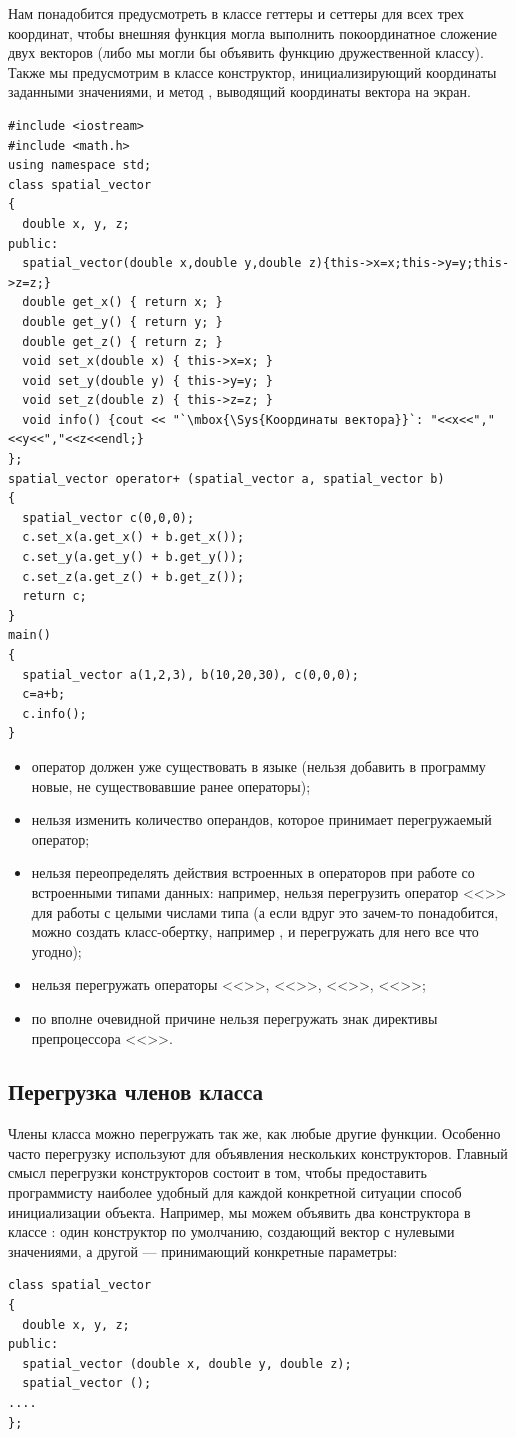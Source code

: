 Нам понадобится предусмотреть в классе 
геттеры и сеттеры для всех трех координат,  чтобы внешняя функция могла выполнить покоординатное сложение двух векторов
(либо мы могли бы объявить функцию дружественной классу). Также мы предусмотрим в классе конструктор, инициализирующий
координаты заданными значениями, и метод , выводящий координаты вектора
на экран. 
\begin{lstlisting}
#include <iostream>
#include <math.h>
using namespace std;
class spatial_vector 
{
  double x, y, z;
public:
  spatial_vector(double x,double y,double z){this->x=x;this->y=y;this->z=z;}
  double get_x() { return x; }
  double get_y() { return y; }
  double get_z() { return z; }
  void set_x(double x) { this->x=x; }
  void set_y(double y) { this->y=y; }
  void set_z(double z) { this->z=z; }
  void info() {cout << "`\mbox{\Sys{Координаты вектора}}`: "<<x<<","<<y<<","<<z<<endl;}
};
spatial_vector operator+ (spatial_vector a, spatial_vector b) 
{
  spatial_vector c(0,0,0);
  c.set_x(a.get_x() + b.get_x());
  c.set_y(a.get_y() + b.get_y());
  c.set_z(a.get_z() + b.get_z());
  return c;
}
main() 
{
  spatial_vector a(1,2,3), b(10,20,30), c(0,0,0);
  c=a+b;
  c.info();
}
\end{lstlisting}

\begin{itemize}
\item оператор должен уже существовать в языке (нельзя добавить в программу новые, не существовавшие ранее операторы);
\item нельзя изменить количество операндов, которое принимает перегружаемый оператор;
\item нельзя переопределять действия встроенных в  операторов при работе со встроенными типами данных: например,
нельзя перегрузить оператор <<\Sys{+}>> для работы с целыми числами типа  (а
если вдруг это зачем-то понадобится, можно создать класс-обертку, например 
, и перегружать для него все что угодно);
\item нельзя перегружать операторы <<>>, <<>>,
<<>>, <<\Sys{::}>>;
\item по вполне очевидной причине нельзя перегружать знак директивы препроцессора <<\Sys{\#}>>.
\end{itemize}
\subsection[Перегрузка членов класса]{Перегрузка членов класса}
Члены класса можно перегружать так же, как любые другие функции. Особенно часто перегрузку используют для объявления
нескольких конструкторов. Главный смысл перегрузки конструкторов состоит в том, чтобы предоставить программисту
наиболее удобный для каждой конкретной ситуации способ инициализации объекта. Например, мы можем объявить два
конструктора в классе : один конструктор по умолчанию, создающий вектор с нулевыми
значениями, а другой --- принимающий конкретные параметры:
\begin{lstlisting}
class spatial_vector 
{
  double x, y, z;
public:
  spatial_vector (double x, double y, double z);
  spatial_vector ();
....
};
\end{lstlisting}

